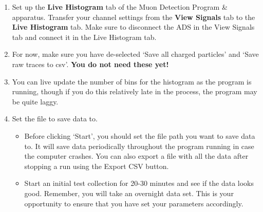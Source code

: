 \documentclass{../lab}
\begin{document}
\begin{enumerate}
    \item Set up the \textbf{Live Histogram} tab of the Muon Detection Program \& apparatus. Transfer your channel settings from the \textbf{View Signals} tab to the \textbf{Live Histogram} tab. Make sure to disconnect the ADS in the View Signals tab and connect it in the Live Histogram tab.

    \item For now, make sure you have de-selected `Save all charged particles' and `Save raw traces to csv'. \textbf{You do not need these yet!}
    
    \item You can live update the number of bins for the histogram as the program is running, though if you do this relatively late in the process, the program may be quite laggy.

    \item Set the file to save data to.

    \begin{itemize}
        \item Before clicking `Start', you should set the file path you want to save data to. It will save data periodically throughout the program running in case the computer crashes. You can also export a file with all the data after stopping a run using the Export CSV button.  %




        \item Start an initial test collection for 20-30 minutes and see if the data looks good. Remember, you will take an overnight data set. This is your opportunity to ensure that you have set your parameters accordingly.

    \end{itemize}

\end{enumerate}
\end{document}
